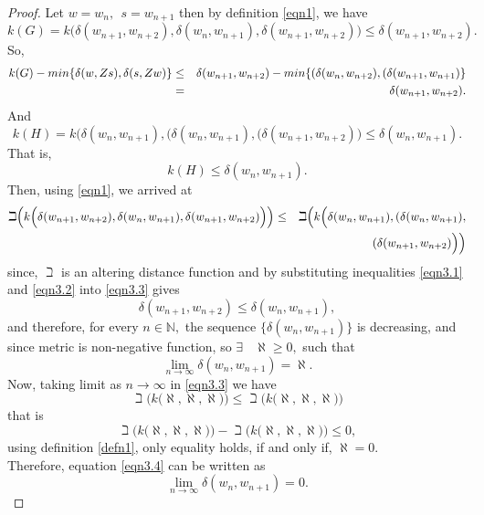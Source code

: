 \documentclass[10pt,a4paper]{amsart}
\begin{document}
	\begin{proof}
		Let $w=w_n,~~s=w_{n+1}$ then by definition \ref{eqn1}, we have
		$$k(G)= k\Big(\delta(w_{n+1}, w_{n+2}), \delta(w_n,w_{n+1}), \delta(w_{n+1},w_{n+2})\Big) \leq \delta(w_{n+1}, w_{n+2}).$$
		So,
		\begin{eqnarray}\label{eqn3.1}
			k(G)- min\{\delta(w,Zs), \delta(s,Zw)\}&\leq& \delta(w_{n+1}, w_{n+2})-min\{(\delta(w_n, w_{n+2}),(\delta(w_{n+1}, w_{n+1})\}\notag\\
			&=& \delta(w_{n+1}, w_{n+2}).
		\end{eqnarray}
		And
		\begin{equation}\label{eqn3.2}
			k(H)=k\Big(\delta(w_n, w_{n+1}),(\delta(w_n, w_{n+1}),(\delta(w_{n+1},w_{n+2})\Big) \leq \delta(w_n, w_{n+1}).
		\end{equation}
		That is, 
		$$k(H) \leq\delta(w_n, w_{n+1}).$$
		Then, using \ref{eqn1}, we arrived at
		\begin{eqnarray}\label{eqn3.3}
			\beth \Big(k\Big(\delta(w_{n+1}, w_{n+2}), \delta(w_n,w_{n+1}), \delta(w_{n+1},w_{n+2})\Big)\Big)
			&\leq& \beth \Big(k\Big(\delta(w_n, w_{n+1}),(\delta(w_n, w_{n+1}),\notag\\
			&&(\delta(w_{n+1},w_{n+2})\Big)\Big)
		\end{eqnarray}
		since, $\beth$ is an altering distance function and by substituting inequalities \ref{eqn3.1} and \ref{eqn3.2} into \ref{eqn3.3} gives 
		\begin{equation}\label{eqn3.6}
		\delta(w_{n+1}, w_{n+2}) \leq \delta(w_n, w_{n+1}),
	\end{equation}
		and therefore, for every $n \in \mathbb{N},$ the sequence $\{\delta(w_n, w_{n+1})\}$ is decreasing, and since metric is non-negative function, so $ \exists~~~~ \aleph \geq 0,$ such that
		\begin{equation}\label{eqn3.4}
			\lim_{n \to \infty} \delta(w_{n}, w_{n+1}) = \aleph.
		\end{equation}
		Now, taking limit as $n \to \infty$ in \ref{eqn3.3} we have
		\begin{equation*}
			\beth \Big(k\Big(\aleph, \aleph, \aleph\Big)\Big) 
			\leq \beth \Big( k\Big(\aleph,\aleph,\aleph\Big) \Big) 
		\end{equation*}
		that is $$\beth \Big(k\Big(\aleph, \aleph, \aleph\Big)\Big) 
		- \beth \Big(k\Big(\aleph,\aleph,\aleph\Big)\Big) \leq  0,$$
		using definition \ref{defn1}, only equality holds, if and only if, $\aleph = 0.$ \\
		Therefore, equation \ref{eqn3.4} can be written as 
		\begin{equation}\label{equation3.6}
			\lim_{n \to \infty} \delta(w_{n}, w_{n+1}) = 0.
		\end{equation}
		

\end{proof}
\end{document}
